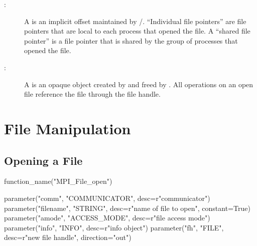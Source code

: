 \begin{description}
\item[:]
A  is an implicit offset maintained by \MPI/.
``Individual file pointers'' are file pointers that are local to
each process that opened the file.
A ``shared file pointer'' is a file pointer that is shared by
the group of processes that opened the file.

\item[:]
A  is an opaque object created by 
and freed by .
All operations on an open file
reference the file through the file handle.

\end{description}

\section{File Manipulation}
\label{sec:io-filecntl}

\subsection{Opening a File}
\label{sec:io-filecntl-open}

%
%
\begin{mpi-binding}
    function_name("MPI_File_open")
    
    parameter("comm", "COMMUNICATOR", desc=r"communicator")
    parameter("filename", "STRING", desc=r"name of file to open", constant=True)
    parameter("amode", "ACCESS_MODE", desc=r"file access mode")
    parameter("info", "INFO", desc=r"info object")
    parameter("fh", "FILE", desc=r"new file handle", direction="out")
\end{mpi-binding}

